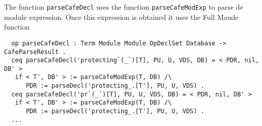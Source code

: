 {\begin{comment}
  ***parse equations at meta-level
  eq parseCafeDecl('eq_=_.['CafeBubble[T], 'CafeBubble[T']], CafeM) = CafeM . ***addEqs((eq 'T = T' [none] .), CafeM) .
  eq parseCafeDecl('cq_=_if_.['CafeBubble[T], 'CafeBubble[T'], 'CafeBubble[T'']], CafeM) = CafeM .
  eq parseCafeDecl('ceq_=_if_.['CafeBubble[T], 'CafeBubble[T'], 'CafeBubble[T'']], CafeM) = CafeM .
   *** addEqs((ceq T = T' if T'' = ''true.Bool [none] .), CafeM) .
   ***to be handled
  eq parseCafeDecl('bceq_=_if_.['CafeBubble[T], 'CafeBubble[T'], 'CafeBubble[T'']], CafeM) = CafeM .
  eq parseCafeDecl('bcq_=_if_.['CafeBubble[T], 'CafeBubble[T'], 'CafeBubble[T'']], CafeM) = CafeM .

  eq parseCafeDecl('var_:_.['neCafeTokenList[T], T'], CafeM) = CafeM .
  eq parseCafeDecl('vars_:_.['neCafeTokenList[T], T'], CafeM) = CafeM .


  **************************************
  ***convert to Functional Module
  **************************************
\end{comment}
}

The function \verb"parseCafeDecl" uses the function \texttt{parseCafeModExp}
to parse de module expression. Once this expression is obtained it uses the
Full Maude function

{\codesize
\begin{verbatim}
  op parseCafeDecl : Term Module Module OpDeclSet Database -> CafeParseResult .
  ceq parseCafeDecl('protecting`(_`)[T], PU, U, VDS, DB) = < PDR, nil, DB' >
   if < T', DB' > := parseCafeModExp(T, DB) /\
      PDR := parseDecl('protecting_.[T'], PU, U, VDS) .
  ceq parseCafeDecl('pr`(_`)[T], PU, U, VDS, DB) = < PDR, nil, DB' >
   if < T', DB' > := parseCafeModExp(T, DB) /\
      PDR := parseDecl('protecting_.[T'], PU, U, VDS) .
  ...
\end{verbatim}
}

{\codesize
\begin{comment}
  ceq parseCafeDecl('extending`(_`)[T], PU, U, VDS, DB) = < PDR, nil, DB' >
   if < T', DB' > := parseCafeModExp(T, DB) /\
      PDR := parseDecl('extending_.[T'], PU, U, VDS) .
  ceq parseCafeDecl('ex`(_`)[T], PU, U, VDS, DB) = < PDR, nil, DB' >
   if < T', DB' > := parseCafeModExp(T, DB) /\
      PDR := parseDecl('extending_.[T'], PU, U, VDS) .
  ceq parseCafeDecl('inc`(_`)[T], PU, U, VDS, DB) = < PDR, nil, DB' >
   if < T', DB' > := parseCafeModExp(T, DB) /\
      PDR := parseDecl('including_.[T'], PU, U, VDS) .
  ceq parseCafeDecl('including`(_`)[T], PU, U, VDS, DB) = < PDR, nil, DB' >
   if < T', DB' > := parseCafeModExp(T, DB) /\
      PDR := parseDecl('including_.[T'], PU, U, VDS) .
  ceq parseCafeDecl('using`(_`)[T], PU, U, VDS, DB) = < PDR, nil, DB' >
   if < T', DB' > := parseCafeModExp(T, DB) /\
      PDR := parseDecl('including_.[T'], PU, U, VDS) .
  ceq parseCafeDecl('us`(_`)[T], PU, U, VDS, DB) = < PDR, nil, DB' >
   if < T', DB' > := parseCafeModExp(T, DB) /\
      PDR := parseDecl('including_.[T'], PU, U, VDS) .
\end{comment}
}

